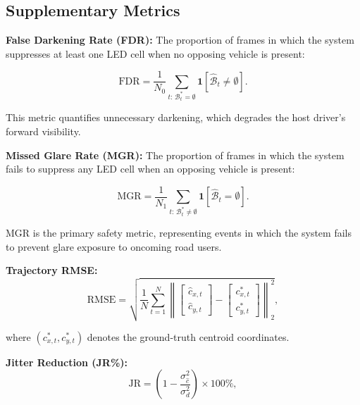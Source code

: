 \documentclass[pdflatex,sn-mathphys-num]{sn-jnl}%
\theoremstyle{thmstyleone}%
\theoremstyle{thmstyletwo}%
\theoremstyle{thmstylethree}%
\begin{document}
\subsection{Supplementary Metrics}
\label{subsec:metrics}

\noindent\textbf{False Darkening Rate (FDR):}
The proportion of frames in which the system suppresses at least one
LED cell when no opposing vehicle is present:

\begin{equation}
\mathrm{FDR} = \frac{1}{N_0}
\sum_{t:\, \mathcal{B}^{*}_t = \emptyset}
\mathbf{1}\!\left[\hat{\mathcal{B}}_t \neq \emptyset\right].
\label{eq:fdr}
\end{equation}

This metric quantifies unnecessary darkening, which degrades the host
driver's forward visibility. ~\cite{Lau2025FAR}

\medskip
\noindent\textbf{Missed Glare Rate (MGR):}
The proportion of frames in which the system fails to suppress any LED
cell when an opposing vehicle is present:

\begin{equation}
\mathrm{MGR} = \frac{1}{N_1}
\sum_{t:\, \mathcal{B}^{*}_t \neq \emptyset}
\mathbf{1}\!\left[\hat{\mathcal{B}}_t = \emptyset\right].
\label{eq:mgr}
\end{equation}

MGR is the primary safety metric, representing events in which the
system fails to prevent glare exposure to oncoming road users.

\medskip
\noindent\textbf{Trajectory RMSE:}
\begin{equation}
\mathrm{RMSE} = \sqrt{
  \frac{1}{N} \sum_{t=1}^{N}
  \left\|
    \begin{bmatrix}\hat{c}_{x,t} \\ \hat{c}_{y,t}\end{bmatrix}
    -
    \begin{bmatrix}c^{*}_{x,t} \\ c^{*}_{y,t}\end{bmatrix}
  \right\|_2^2
},
\label{eq:rmse}
\end{equation}

\noindent where $(c^{*}_{x,t}, c^{*}_{y,t})$ denotes the
ground-truth centroid coordinates. ~\cite{Bishop2006}

\medskip
\noindent\textbf{Jitter Reduction (JR\%):}
\begin{equation}
\mathrm{JR} = \left(1 -
  \frac{\sigma_{\hat{c}}^2}{\sigma_{d}^2}
\right) \times 100\%,
\label{eq:jitter}
\end{equation}
\end{document}

